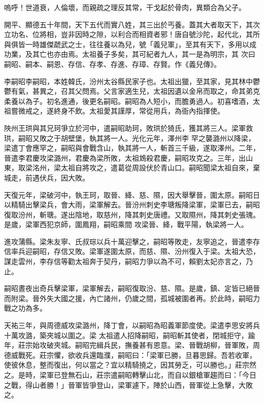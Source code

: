 
\begin{pinyinscope}

 嗚呼！世道衰，人倫壞，而親疏之理反其常，干戈起於骨肉，異類合為父子。



 開平、顯德五十年間，天下五代而實八姓，其三出於丐養。蓋其大者取天下，其次立功名、位將相，豈非因時之隙，以利合而相資者邪！唐自號沙陀，起代北，其所與俱皆一時雄傑虣武之士，往往養以為兒，號「義兒軍」，至其有天下，多用以成功業，及其亡也亦由焉。太祖養子多矣，其可紀者九人，其一是為明宗，其
 次曰嗣昭、嗣本、嗣恩、存信、存孝、存進、存璋、存賢。作《義兒傳》。



 李嗣昭李嗣昭，本姓韓氏，汾州太谷縣民家子也。太祖出獵，至其家，見其林中鬱鬱有氣，甚異之，召其父問焉。父言家適生兒，太祖因遺以金帛而取之，命其弟克柔養以為子。初名進通，後更名嗣昭。嗣昭為人短小，而膽勇過人。初喜嗜酒，太祖嘗微戒之，遂終身不飲。太祖愛其謹厚，常從用兵，為衙內指揮使。



 陜州王珙與其兄珂爭立於河中，遣嗣昭助珂，敗珙於猗氏，獲其將三人。梁軍救珙，嗣昭又敗之于胡壁堡，執其將一人。光化元年，澤州李
 罕之襲潞州以降梁，梁遣丁會應罕之，嗣昭與會戰含山，執其將一人，斬首三千級，遂取澤州。二年，晉遣李君慶攻梁潞州，君慶為梁所敗，太祖鴆殺君慶，嗣昭攻克之。三年，出山東，取梁洺州，梁太祖自將攻之，遣葛從周設伏於青山口。嗣昭聞梁太祖自來，棄城走，前遇伏兵，因大敗。



 天復元年，梁破河中，執王珂，取晉、絳、慈、隰，因大舉擊晉，圍太原。嗣昭日以精騎出擊梁兵，會大雨，梁軍解去。晉汾州刺史李瑭叛降梁軍，梁軍已去，嗣昭復取汾州，斬瑭。遂出陰地，取慈州，降其刺史唐禮。又取隰州，降其刺史張瑰。是歲，梁軍西犯京師，圍鳳翔，嗣昭乘間
 攻梁晉、絳，戰平陽，執梁將一人。



 進攻蒲縣。梁朱友寧、氏叔琮以兵十萬迎擊之，嗣昭等敗走，友寧追之，晉遣李存信率兵迎嗣昭，存信又敗。梁軍遂圍太原，而慈、隰、汾州復入于梁。太祖大恐，謀走雲州，李存信等勸太祖奔于契丹，嗣昭力爭以為不可，賴劉太妃亦言之，乃止。



 嗣昭晝夜出奇兵擊梁軍，梁軍解去，嗣昭復取汾、慈、隰。是歲，鎮、定皆已絕晉而附梁。晉外失大國之援，內亡諸州，仍歲之間，孤城被圍者再。於此時，嗣昭力戰之功為多。



 天祐三年，與周德威攻梁潞州，降丁會，以嗣昭為昭義軍節度使。梁遣李思安將兵十萬攻潞，築夾城以圍之。梁
 太祖遣人招降嗣昭，嗣昭斬其使者，閉城拒守，踰年，莊宗始攻破夾城。嗣昭完緝兵民，撫養甚有恩意。梁、晉戰胡柳，晉軍敗，周德威戰死。莊宗懼，欲收兵還臨濮，嗣昭曰：「梁軍已勝，旦暮思歸。吾若收軍，使彼休息，整而復出，何以當之？宜以精騎撓之，因其勞乏，可以勝也。」莊宗然之。是時，梁軍已登無石山，莊宗遣嗣昭轉擊山北，而自以銀槍軍趨而曰：「今日之戰，得山者勝！」晉軍皆爭登山，梁軍遽下，陣於山西，晉軍從上急擊，大敗之。




\end{pinyinscope}
